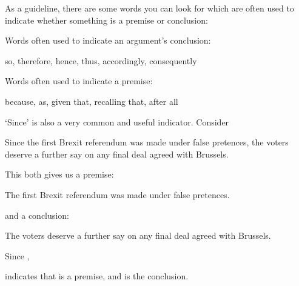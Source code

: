 As a guideline, there are some words you can look for which are often used to indicate whether something is a premise or conclusion:
	\begin{highlighted}
	Words often used to indicate an argument's conclusion:
		\begin{center}
			so, therefore, hence, thus, accordingly, consequently
		\end{center}
	Words often used to indicate a premise:
		\begin{center}
			because, as, given that, recalling that, after all
		\end{center}
	\end{highlighted}
`Since' is also a very common and useful indicator. 
%
Consider	\begin{ebullet}	\item Since the first Brexit referendum was made under false pretences,
	{the voters deserve a further say on any final deal agreed with
		Brussels}.\end{ebullet}
This both gives us a premise: \begin{ebullet}	\item The first Brexit referendum was made under false pretences.\end{ebullet}
	and a conclusion:\begin{ebullet}	\item The voters deserve a further say on any final deal agreed with
			Brussels.\end{ebullet}
\begin{highlighted}
	\begin{center}
		Since \metaX, \metaY
	\end{center} indicates that \metaX is a premise, and \metaY is the conclusion. 
\end{highlighted}


